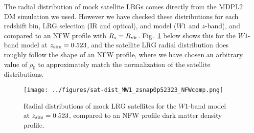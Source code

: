 \documentclass[11pt,preprint]{aastex}
\begin{document}
\noindent {}

The radial distribution of mock satellite LRGs comes directly from the MDPL2 DM simulation we used. However we have checked these distributions for each redshift bin, LRG selection (IR and optical), and model ($W1$ and $z$-band), and compared to an NFW profile with $R_{\rm s}=R_{\rm vir}$. Fig.~\ref{fig:sat_dist} below shows this for the $W1$-band model at $z_{\rm sim}=0.523$, and the satellite LRG radial distribution does roughly follow the shape of an NFW profile, where we have chosen an arbitrary value of $\rho_0$ to approximately match the normalization of the satellite distributions.
\begin{figure}[h!]
\centering
  \texttt{[image: ../figures/sat-dist\_MW1\_zsnap0p52323\_NFWcomp.png]}
  \caption{Radial distributions of mock LRG satellites for the $W1$-band model at $z_{\rm sim}=0.523$, compared to an NFW profile dark matter density profile.
  \label{fig:sat_dist}}
\end{figure}
\end{document}
